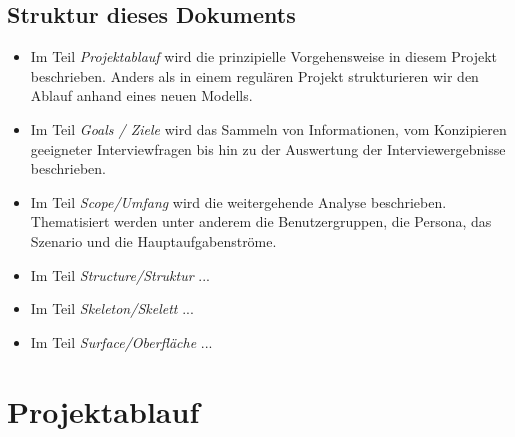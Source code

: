 \documentclass{article}
\begin{document}
\subsection{Struktur dieses Dokuments}

\begin{itemize}
\item Im Teil \textit{Projektablauf} wird die prinzipielle Vorgehensweise in diesem Projekt beschrieben. Anders als in einem regulären Projekt strukturieren wir den Ablauf anhand eines neuen Modells.
\item Im Teil \textit{Goals / Ziele} wird das Sammeln von Informationen, vom Konzipieren geeigneter Interviewfragen bis hin zu der Auswertung der Interviewergebnisse beschrieben.
\item Im Teil \textit{Scope/Umfang} wird die weitergehende Analyse beschrieben. Thematisiert werden unter anderem die Benutzergruppen, die Persona, das Szenario und die Hauptaufgabenströme.
\item Im Teil \textit{Structure/Struktur} ...
\item Im Teil \textit{Skeleton/Skelett} ...
\item Im Teil \textit{Surface/Oberfläche} ...
\end{itemize}

\newpage

\section{Projektablauf}
\end{document}
